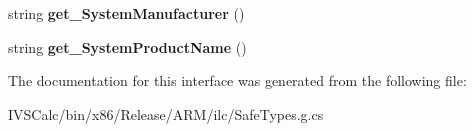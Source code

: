 \begin{DoxyCompactItemize}
string {\bfseries get\+\_\+\+System\+Manufacturer} ()
\item 
\mbox{\label{interface_windows_1_1_security_1_1_exchange_active_sync_provisioning_1_1_i_eas_client_device_information_a8e9fffa713b16a216bd87258d63b9fc6}} 
string {\bfseries get\+\_\+\+System\+Product\+Name} ()
\end{DoxyCompactItemize}


The documentation for this interface was generated from the following file\+:\begin{DoxyCompactItemize}
\item 
I\+V\+S\+Calc/bin/x86/\+Release/\+A\+R\+M/ilc/Safe\+Types.\+g.\+cs\end{DoxyCompactItemize}
